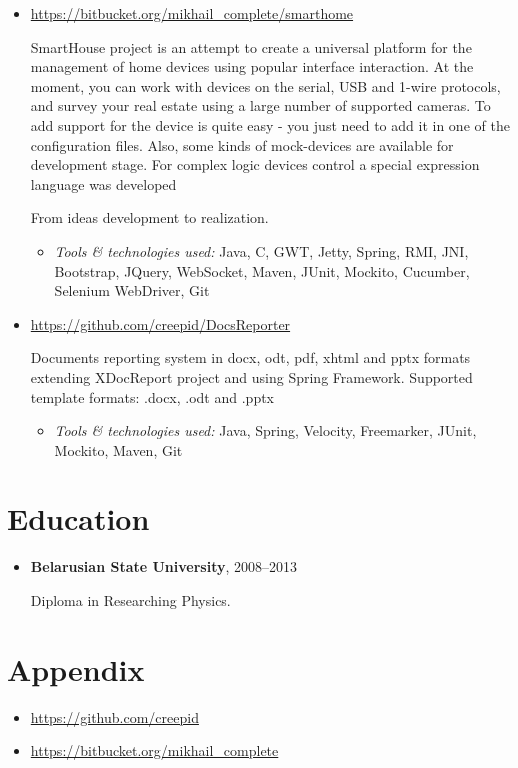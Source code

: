 \documentclass[a4paper, 12pt]{article}
\newcommand{\position}[1]{
    \textbf{#1}}
\newcommand{\itemlabel}[1]{
    \textit{#1:}}
\begin{document}
  
    \begin{itemize}
   
        \item \href{https://bitbucket.org/mikhail_complete/smarthome/src}{https://bitbucket.org/mikhail\_complete/smarthome}

            SmartHouse project is an attempt to create a universal platform for the management of home devices using popular interface interaction. At the moment, you can work with devices on the serial, USB and 1-wire protocols, and survey your real estate using a large number of supported cameras. To add support for the device is quite easy - you just need to add it in one of the configuration files. Also, some kinds of mock-devices are available for development stage.
            For complex logic devices control a special expression language was developed

            From ideas development to realization.

            \begin{itemize}
                \item \itemlabel{Tools \& technologies used} Java, C, GWT, Jetty, Spring, RMI, JNI, Bootstrap, JQuery, WebSocket, Maven, JUnit, Mockito, Cucumber, Selenium WebDriver, Git
            \end{itemize}

        \item \href{https://github.com/creepid/DocsReporter}{https://github.com/creepid/DocsReporter}

            Documents reporting system in docx, odt, pdf, xhtml and pptx formats extending XDocReport project and using Spring Framework.
Supported template formats: .docx, .odt and .pptx

            \begin{itemize}
                \item \itemlabel{Tools \& technologies used} Java, Spring, Velocity, Freemarker, JUnit, Mockito, Maven, Git
            \end{itemize}
            
    \end{itemize}    

\section*{Education}

    \begin{itemize}

        \item \position{Belarusian State University}, 2008--2013

            Diploma in Researching Physics.

    \end{itemize}

\section*{Appendix}

    \begin{itemize}
        \item \href{https://github.com/creepid}{https://github.com/creepid}
    \end{itemize}
        \begin{itemize}
        \item \href{https://bitbucket.org/mikhail_complete}{https://bitbucket.org/mikhail\_complete}
    \end{itemize}
\end{document}
